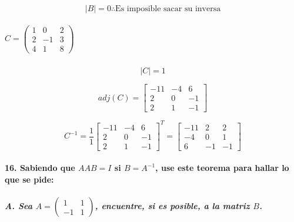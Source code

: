 \documentclass[
]{article}
\begin{document}
\[
|B| = 0 \therefore \text{Es imposible sacar su inversa}
\]

\hypertarget{c-beginpmatrix1022-13418endpmatrix}{%
\subparagraph{\texorpdfstring{\(C = \begin{pmatrix}1&0&2\\2&-1&3\\4&1&8\end{pmatrix}\)}{C = \textbackslash begin\{pmatrix\}1\&0\&2\textbackslash\textbackslash2\&-1\&3\textbackslash\textbackslash4\&1\&8\textbackslash end\{pmatrix\}}}\label{c-beginpmatrix1022-13418endpmatrix}}

\[
|C| = 1
\]

\[
adj(C) = \begin{bmatrix}
    -11&-4&6\\2&0&-1\\2&1&-1
\end{bmatrix}
\]

\[
C^{-1} = \frac{1}{1}\begin{bmatrix}
    -11&-4&6\\2&0&-1\\2&1&-1
\end{bmatrix}^T = \begin{bmatrix}
    -11&2&2\\-4&0&1\\6&-1&-1
\end{bmatrix}
\]

\hypertarget{sabiendo-que-aab-i-si-b-a-1-use-este-teorema-para-hallar-lo-que-se-pide}{%
\paragraph{\texorpdfstring{16. Sabiendo que \(AAB = I\) si
\(B = A^{-1}\), use este teorema para hallar lo que se
pide:}{16. Sabiendo que AAB = I si B = A\^{}\{-1\}, use este teorema para hallar lo que se pide:}}\label{sabiendo-que-aab-i-si-b-a-1-use-este-teorema-para-hallar-lo-que-se-pide}}

\hypertarget{a.-sea-a-beginpmatrix11-11endpmatrix-encuentre-si-es-posible-a-la-matriz-b.}{%
\subparagraph{\texorpdfstring{A. Sea
\(A = \begin{pmatrix}1&1\\-1&1\end{pmatrix}\), encuentre, si es posible,
a la matriz
\(B\).}{A. Sea A = \textbackslash begin\{pmatrix\}1\&1\textbackslash\textbackslash-1\&1\textbackslash end\{pmatrix\}, encuentre, si es posible, a la matriz B.}}\label{a.-sea-a-beginpmatrix11-11endpmatrix-encuentre-si-es-posible-a-la-matriz-b.}}
\end{document}
